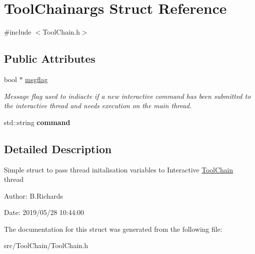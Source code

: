 \hypertarget{structToolChainargs}{\section{Tool\-Chainargs Struct Reference}
\label{structToolChainargs}
}


{\ttfamily \#include $<$Tool\-Chain.\-h$>$}

\subsection*{Public Attributes}
\begin{DoxyCompactItemize}
\item 
\hypertarget{structToolChainargs_a3551269b039d543b844a2d0d924ce96b}{bool $\ast$ \hyperlink{structToolChainargs_a3551269b039d543b844a2d0d924ce96b}{msgflag}}\label{structToolChainargs_a3551269b039d543b844a2d0d924ce96b}

\begin{DoxyCompactList}\small\item\em Message flag used to indiacte if a new interactive command has been submitted to the interactive thread and needs execution on the main thread. \end{DoxyCompactList}\item 
\hypertarget{structToolChainargs_a9d4c78b8b89eba4b7e8af9e6278c1bfd}{std\-::string {\bfseries command}}\label{structToolChainargs_a9d4c78b8b89eba4b7e8af9e6278c1bfd}

\end{DoxyCompactItemize}


\subsection{Detailed Description}
Simple struct to pass thread initalisation variables to Interactive \hyperlink{classToolChain}{Tool\-Chain} thread

\begin{DoxyParagraph}{Author\-:}
B.\-Richards 
\end{DoxyParagraph}
\begin{DoxyParagraph}{Date\-:}
2019/05/28 10\-:44\-:00 
\end{DoxyParagraph}


The documentation for this struct was generated from the following file\-:\begin{DoxyCompactItemize}
\item 
src/\-Tool\-Chain/Tool\-Chain.\-h\end{DoxyCompactItemize}
